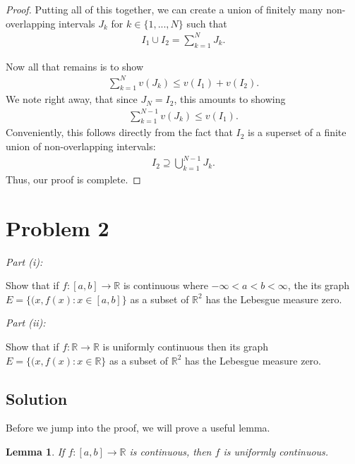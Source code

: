 \documentclass[10pt,a4paper]{article}
\makeatletter
\theoremstyle{theorem}
\newtheorem{lemma}{Lemma}
\newcommand{\proofpart}[2]{%
  \par
  \addvspace{\medskipamount}%
  \noindent\emph{Part #1: #2}\par\nobreak
  \addvspace{\smallskipamount}%
  \@afterheading
}
\theoremstyle{definition}
\makeatother
\begin{document}
\begin{proof}
Putting all of this together, we can create a union of finitely many non-overlapping intervals $J_k$ for $k \in\{ 1,...,N\}$ such that 
\begin{align*}
I_1 \cup I_2 = \sum_{k=1}^{N} J_k.
\end{align*}

Now all that remains is to show
\begin{align*}
\sum_{k=1}^N v(J_k) \leq v(I_1) + v(I_2).
\end{align*}
We note right away, that since $J_N = I_2$, this amounts to showing 
\begin{align*}
\sum_{k=1}^{N-1} v(J_k) \leq v(I_1).
\end{align*}
Conveniently,  this follows directly from the fact that $I_2$ is a superset of a finite union of non-overlapping intervals:
\begin{align*}
I_2 \supseteq \bigcup_{k=1}^{N-1} J_k.
\end{align*}
Thus, our proof is complete.
\end{proof}

\section*{Problem 2}
\proofpart{(i)}{} Show that if $f:[a,b] \to \mathbb{R}$ is continuous where $-\infty < a < b < \infty$, the its graph $E = \{(x, f(x): x \in [a, b] \}$ as a subset of $\mathbb{R}^2$ has the Lebesgue measure zero.

\proofpart{(ii)}{} Show that if $f:\mathbb{R} \to \mathbb{R}$ is uniformly continuous then its graph $E = \{(x, f(x): x \in \mathbb{R} \}$ as a subset of $\mathbb{R}^2$ has the Lebesgue measure zero.

\subsection*{Solution}
Before we jump into the proof, we will prove a useful lemma.
\begin{lemma}
If $f:[a,b] \to \mathbb{R}$ is continuous, then $f$ is uniformly continuous.
\end{lemma}
\end{document}
